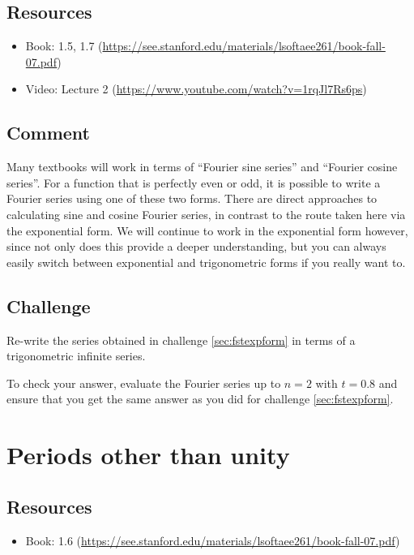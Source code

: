 \subsection*{Resources}
\begin{itemize}
    \item Book: 1.5, 1.7 (\url{https://see.stanford.edu/materials/lsoftaee261/book-fall-07.pdf})
    \item Video: Lecture 2 (\url{https://www.youtube.com/watch?v=1rqJl7Rs6ps})
\end{itemize}

\subsection*{Comment}
Many textbooks will work in terms of ``Fourier sine series'' and ``Fourier cosine series''. For a function that is perfectly even or odd, it is possible to write a Fourier series using one of these two forms. There are direct approaches to calculating sine and cosine Fourier series, in contrast to the route taken here via the exponential form. We will continue to work in the exponential form however, since not only does this provide a deeper understanding, but you can always easily switch between exponential and trigonometric forms if you really want to.


\subsection*{Challenge}
Re-write the series obtained in challenge \ref{sec:fstexpform} in terms of a trigonometric infinite series.

To check your answer, evaluate the Fourier series up to $n=2$ with $t=0.8$ and ensure that you get the same answer as you did for challenge \ref{sec:fstexpform}.




\newpage
\section{Periods other than unity}

\subsection*{Resources}
\begin{itemize}
    \item Book: 1.6 (\url{https://see.stanford.edu/materials/lsoftaee261/book-fall-07.pdf})
\end{itemize}

